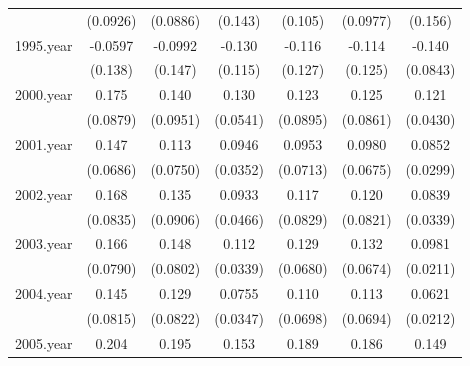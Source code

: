 {\begin{tabular}{l*{6}{c}}
            &    (0.0926)         &    (0.0886)         &     (0.143)         &     (0.105)         &    (0.0977)         &     (0.156)         \\
[1em]
1995.year   &     -0.0597         &     -0.0992         &      -0.130         &      -0.116         &      -0.114         &      -0.140         \\
            &     (0.138)         &     (0.147)         &     (0.115)         &     (0.127)         &     (0.125)         &    (0.0843)         \\
[1em]
2000.year   &       0.175         &       0.140         &       0.130\sym{*}  &       0.123         &       0.125         &       0.121\sym{**} \\
            &    (0.0879)         &    (0.0951)         &    (0.0541)         &    (0.0895)         &    (0.0861)         &    (0.0430)         \\
[1em]
2001.year   &       0.147\sym{*}  &       0.113         &      0.0946\sym{**} &      0.0953         &      0.0980         &      0.0852\sym{**} \\
            &    (0.0686)         &    (0.0750)         &    (0.0352)         &    (0.0713)         &    (0.0675)         &    (0.0299)         \\
[1em]
2002.year   &       0.168\sym{*}  &       0.135         &      0.0933         &       0.117         &       0.120         &      0.0839\sym{**} \\
            &    (0.0835)         &    (0.0906)         &    (0.0466)         &    (0.0829)         &    (0.0821)         &    (0.0339)         \\
[1em]
2003.year   &       0.166\sym{*}  &       0.148         &       0.112\sym{**} &       0.129\sym{*}  &       0.132\sym{*}  &      0.0981\sym{***}\\
            &    (0.0790)         &    (0.0802)         &    (0.0339)         &    (0.0680)         &    (0.0674)         &    (0.0211)         \\
[1em]
2004.year   &       0.145         &       0.129         &      0.0755\sym{*}  &       0.110         &       0.113         &      0.0621\sym{**} \\
            &    (0.0815)         &    (0.0822)         &    (0.0347)         &    (0.0698)         &    (0.0694)         &    (0.0212)         \\
[1em]
2005.year   &       0.204         &       0.195         &       0.153         &       0.189         &       0.186         &       0.149         \\

\end{tabular}}
